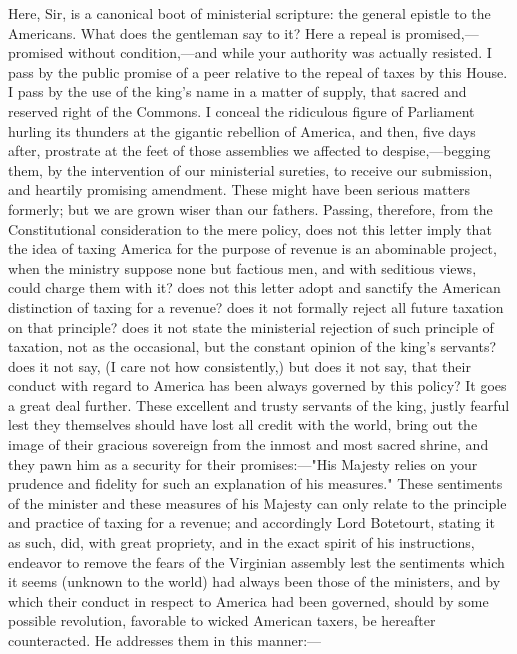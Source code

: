 Here, Sir, is a canonical boot of ministerial scripture: the general epistle to the Americans. What does the gentleman say to it? Here a repeal is promised,—promised without condition,—and while your authority was actually resisted. I pass by the public promise of a peer relative to the repeal of taxes by this House. I pass by the use of the king's name in a matter of supply, that sacred and reserved right of the Commons. I conceal the ridiculous figure of Parliament hurling its thunders at the gigantic rebellion of America, and then, five days after, prostrate at the feet of those assemblies we affected to despise,—begging them, by the intervention of our ministerial sureties, to receive our submission, and heartily promising amendment. These might have been serious matters formerly; but we are grown wiser than our fathers. Passing, therefore, from the Constitutional consideration to the mere policy, does not this letter imply that the idea of taxing America for the purpose of revenue is an abominable project, when the ministry suppose none but factious men, and with seditious views, could charge them with it? does not this letter adopt and sanctify the American distinction of taxing for a revenue? does it not formally reject all future taxation on that principle? does it not state the ministerial rejection of such principle of taxation, not as the occasional, but the constant opinion of the king's servants? does it not say, (I care not how consistently,) but does it not say, that their conduct with regard to America has been always governed by this policy? It goes a great deal further. These excellent and trusty servants of the king, justly fearful lest they themselves should have lost all credit with the world, bring out the image of their gracious sovereign from the inmost and most sacred shrine, and they pawn him as a security for their promises:—"His Majesty relies on your prudence and fidelity for such an explanation of his measures." These sentiments of the minister and these measures of his Majesty can only relate to the principle and practice of taxing for a revenue; and accordingly Lord Botetourt, stating it as such, did, with great propriety, and in the exact spirit of his instructions, endeavor to remove the fears of the Virginian assembly lest the sentiments which it seems (unknown to the world) had always been those of the ministers, and by which their conduct in respect to America had been governed, should by some possible revolution, favorable to wicked American taxers, be hereafter counteracted. He addresses them in this manner:—

